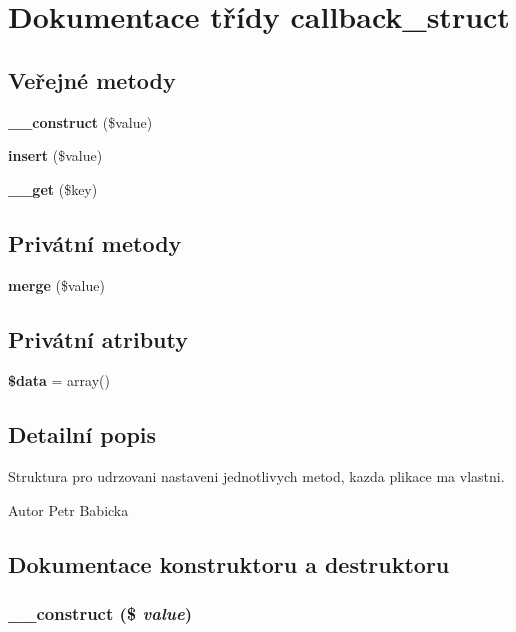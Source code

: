 \section{Dokumentace třídy callback\_\-struct}
\label{d7/df8/classcallback__struct}
\subsection*{Veřejné metody}
\begin{DoxyCompactItemize}
\item 
{\bf \_\-\_\-construct} (\$value)
\item 
{\bf insert} (\$value)
\item 
{\bf \_\-\_\-get} (\$key)
\end{DoxyCompactItemize}
\subsection*{Privátní metody}
\begin{DoxyCompactItemize}
\item 
{\bf merge} (\$value)
\end{DoxyCompactItemize}
\subsection*{Privátní atributy}
\begin{DoxyCompactItemize}
\item 
{\bf \$data} = array()
\end{DoxyCompactItemize}


\subsection{Detailní popis}
Struktura pro udrzovani nastaveni jednotlivych metod, kazda plikace ma vlastni. \begin{DoxyAuthor}{Autor}
Petr Babicka 
\end{DoxyAuthor}


\subsection{Dokumentace konstruktoru a destruktoru}
\subsubsection[{\_\-\_\-construct}]{\setlength{\rightskip}{0pt plus 5cm}\_\-\_\-construct (\$ {\em value})}\label{d7/df8/classcallback__struct_a7e17a19b592345a03763f050fffe0ce7}


